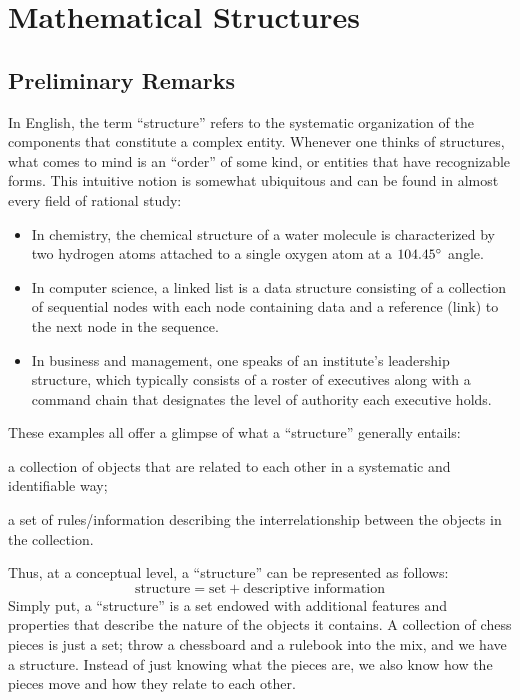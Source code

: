 \chapter{Mathematical Structures}
\section{Preliminary Remarks} \label{sec:preliminary-remarks-for-mathematical-structures}
In English, the term ``structure'' refers to the systematic organization of the components that constitute a complex entity.
Whenever one thinks of structures, what comes to mind is an ``order'' of some kind, or entities that have recognizable forms.
This intuitive notion is somewhat ubiquitous and can be found in almost every field of rational study:
\begin{itemize}
    \item In chemistry, the chemical structure of a water molecule is characterized by two hydrogen atoms attached to a single
          oxygen atom at a \( 104.45\degree \) angle.
    \item In computer science, a linked list is a data structure consisting of a collection of sequential nodes with each node
          containing data and a reference (link) to the next node in the sequence.
    \item In business and management, one speaks of an institute's leadership structure, which typically consists of a roster of
          executives along with a command chain that designates the level of authority each executive holds.
\end{itemize}
These examples all offer a glimpse of what a ``structure'' generally entails:
\begin{enumerate*}[label=(\alph*)]
    \item a collection of objects that are related to each other in a systematic and identifiable way;
    \item a set of rules/information describing the interrelationship between the objects in the collection.
\end{enumerate*}
Thus, at a conceptual level, a ``structure'' can be represented as follows:
\begin{equation*}
    \text{structure} = \text{set} + \text{descriptive information}
\end{equation*}
Simply put, a ``structure'' is a set endowed with additional features and properties that describe
the nature of the objects it contains. A collection of chess pieces is just a set; throw
a chessboard and a rulebook into the mix, and we have a structure. Instead of just knowing
what the pieces are, we also know how the pieces move and how they relate to each other.

